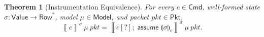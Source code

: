 \documentclass{article}
\newcommand{\pkt}{\mathit{pkt}}
\newcommand{\denote}[1]{\left\llbracket#1\right\rrbracket}
\newcommand{\Value}{\mathsf{Value}}
\newcommand{\Cmd}{\mathsf{Cmd}}
\newcommand{\Pkt}{\mathsf{Pkt}}
\newcommand{\Model}{\mathsf{Model}}
\newcommand{\Row}{\mathsf{Row}}
\newcommand{\assume}{\mathop{\mathsf{assume}}}
\newcommand{\state}[1]{\llparenthesis#1\rrparenthesis}
\newtheorem{theorem}{Theorem}
\newtheorem{lemma}{Lemma}
\begin{document}


\begin{samepage}
\begin{theorem}[Instrumentation Equivalence]
  \label{thm:instr-equiv}
  For every $c \in \Cmd$, well-formed state $\sigma : \Value \to \Row^*$, model
  $\mu \in \Model$, and packet $\pkt \in \Pkt$, \[\denote{c}^\sigma~\mu~\pkt = \denote{c[?];\assume \state\sigma_c}^\sigma~\mu~\pkt.\]
\end{theorem}
\end{samepage}
\end{document}
